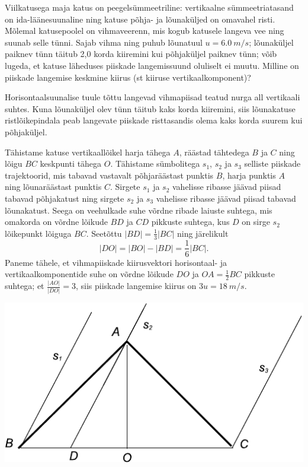 
Viilkatusega maja katus on peegelsümmeetriline: vertikaalne sümmeetriatasand on
ida-läänesuunaline ning katuse
põhja- ja lõunaküljed on omavahel risti. Mõlemal katusepoolel on vihmaveerenn,
mis kogub katusele langeva vee ning suunab selle tünni.
Sajab vihma ning puhub lõunatuul $u= \SI{6,0}{m/s}$; lõunaküljel paiknev tünn
täitub 2,0 korda kiiremini kui põhjaküljel paiknev tünn; võib
lugeda, et katuse läheduses piiskade langemissuund oluliselt ei muutu.
Milline on piiskade langemise keskmine kiirus (st kiiruse vertikaalkomponent)?

\hint
Horisontaalsuunalise tuule tõttu langevad vihmapiisad teatud nurga all vertikaali suhtes. Kuna lõunaküljel olev tünn täitub kaks korda kiiremini, siis lõunakatuse ristlõikepindala peab langevate piiskade risttasandis olema kaks korda suurem kui põhjaküljel.

\solu
Tähistame katuse vertikaallõikel harja tähega $A$, räästad tähtedega $B$ ja $C$ ning lõigu $BC$ keskpunti tähega $O$. 
Tähistame sümbolitega $s_1$, $s_2$ ja $s_3$ selliste piiskade trajektoorid, mis tabavad vastavalt põhjaräästast punktis $B$, harja punktis $A$ ning lõunaräästast punktis $C$. Sirgete $s_1$ ja $s_2$ vahelisse ribasse jäävad piisad tabavad põhjakatust ning sirgete $s_2$ ja $s_3$ vahelisse ribasse jäävad 
piisad tabavad lõunakatust. Seega on veehulkade suhe võrdne ribade laiuste suhtega, mis omakorda on võrdne lõikude $BD$ ja $CD$ pikkuste suhtega, kus $D$ on sirge $s_2$ lõikepunkt lõiguga $BC$. Seetõttu $|BD|=\frac 13 |BC|$ ning järelikult
\[
|DO|=|BO|-|BD|=\frac 16 |BC|.
\]
Paneme tähele, et vihmapiiskade 
kiirusvektori horisontaal- ja vertikaalkomponentide suhe on võrdne lõikude $DO$ ja $OA=\frac 12 BC$ pikkuste suhtega; et $\frac {|AO|}{|DO|}=3$, siis piiskade 
langemise kiirus on $3u=\SI{18}{m/s}$.

\begin{center}
\includegraphics[width=0.5\linewidth]{2012-v2g-07-katus}
\end{center}

